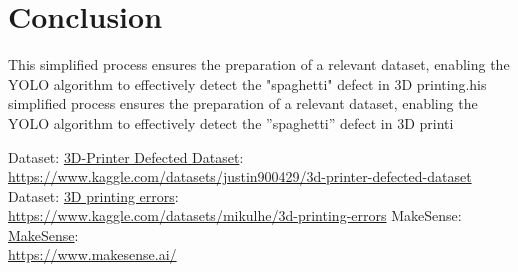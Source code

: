 \documentclass[12pt,a4paper]{article}
\begin{document}
\newpage

\section{Conclusion}
This simplified process ensures the preparation of a relevant dataset, enabling the YOLO algorithm to effectively detect the "spaghetti" defect in 3D printing.his simplified process ensures the preparation of a relevant dataset, enabling the YOLO
algorithm to effectively detect the ”spaghetti” defect in 3D printi


\begin{thebibliography}{9}

        Dataset: \href{https://www.kaggle.com/datasets/justin900429/3d-printer-defected-dataset}{3D-Printer Defected Dataset}: \\
        {\footnotesize \url{https://www.kaggle.com/datasets/justin900429/3d-printer-defected-dataset}}
        Dataset: \href{https://www.kaggle.com/datasets/mikulhe/3d-printing-errors}{3D printing errors}: \\
        {\footnotesize \url{https://www.kaggle.com/datasets/mikulhe/3d-printing-errors}}
        MakeSense: \href{https://www.makesense.ai/}{MakeSense}: \\
        {\footnotesize \url{https://www.makesense.ai/}}

    \end{thebibliography}
\end{document}
